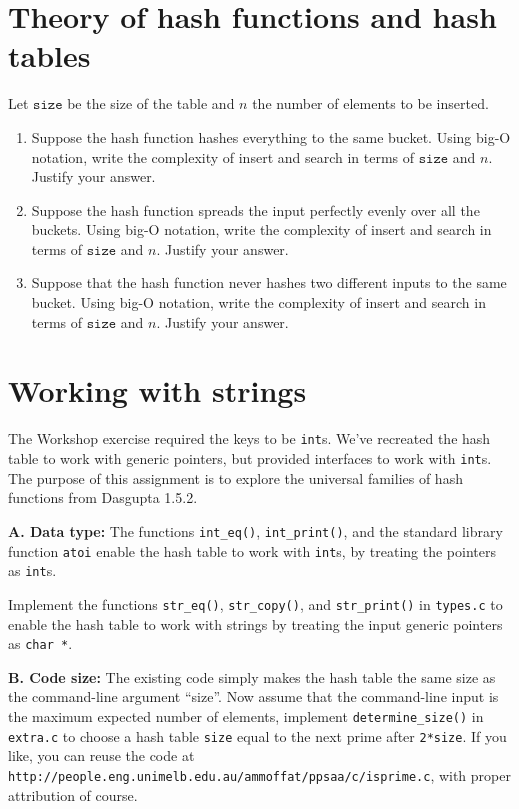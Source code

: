\documentclass[11pt]{article}
\newcommand{\size}{{\texttt{size}}}
\begin{document}
\section*{Theory of hash functions and hash tables}
Let $\size$ be the size of the table and $n$ the number of elements to be inserted.
\begin{enumerate}
        \item Suppose the hash function hashes everything to the same bucket.
            Using big-O notation, write the complexity of insert and search in
            terms of $\size$ and $n$.  Justify your answer.
        \item Suppose the hash function spreads the input perfectly evenly over
            all the buckets.  Using big-O notation, write the complexity of
            insert and search in terms of $\size$ and $n$.  Justify your
            answer.
        \item Suppose that the hash function never hashes two different inputs
            to the same bucket.  Using big-O notation, write the complexity of
            insert and search in terms of $\size$ and $n$.  Justify your
            answer.
      \end{enumerate}

\section*{Working with strings}
The Workshop exercise required the keys to be \texttt{int}s. We've recreated the
hash table to work with generic pointers, but provided interfaces to work with
\texttt{int}s. The purpose of this assignment is to explore the universal families
of hash functions from Dasgupta 1.5.2.

\begin{description}
    \item{\bf A. Data type:}
        The functions \texttt{int\_eq()}, \texttt{int\_print()},
        and the standard library function \texttt{atoi} enable the hash table to work with \texttt{int}s,
        by treating the pointers as \texttt{int}s.

        Implement the functions \texttt{str\_eq()}, \texttt{str\_copy()},
        and \texttt{str\_print()} in \texttt{types.c} to enable the hash table to work with
        strings by treating the input generic pointers as \texttt{char *}.

    \item{\bf B. Code size:}
        The existing code simply makes the hash table the same size as the command-line argument ``size''.
        Now assume that the command-line input is the maximum expected number of elements,
        implement \texttt{determine\_size()} in \texttt{extra.c} to choose a hash table \texttt{size}
        equal to the next prime after \texttt{2*size}.
        If you like, you can reuse the code at
        \texttt{http://people.eng.unimelb.edu.au/ammoffat/ppsaa/c/isprime.c},
        with proper attribution of course.
\end{description}
\end{document}

